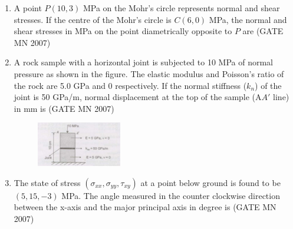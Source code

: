 \documentclass[journal]{IEEEtran}
\begin{document}
\begin{enumerate}
\item A point $P(10,3)$ MPa on the Mohr’s circle represents normal and shear stresses. If the centre of the Mohr’s circle is $C(6,0)$ MPa, the normal and shear stresses in MPa on the point diametrically opposite to $P$ are
	\hfill (GATE MN 2007)
\begin{enumerate}
	\begin{multicols}{4}
    \item 2, $-3$
    \item 4, $-3$
    \item 2, 3
    \item 4, 3
	    \end{multicols}
\end{enumerate}


\item A rock sample with a horizontal joint is subjected to 10 MPa of normal pressure as shown in the figure. The elastic modulus and Poisson’s ratio of the rock are 5.0 GPa and 0 respectively. If the normal stiffness ($k_n$) of the joint is 50 GPa/m, normal displacement at the top of the sample (A$A'$ line) in mm is
	\hfill (GATE MN 2007)
\begin{figure}[H]
    \centering
\includegraphics[width=0.35\textwidth]{Screenshot_2025_0812_124013.png}
\caption{}
    \label{fig:Q27}
\end{figure}
\begin{enumerate}
	\begin{multicols}{4}
    \item 0.2
    \item 0.4
    \item 0.6
    \item 0.8
	    \end{multicols}
\end{enumerate}



\item The state of stress $(\sigma_{xx}, \sigma_{yy}, \tau_{xy})$ at a point below ground is found to be $(5, 15, -3)$ MPa. The angle measured in the counter clockwise direction between the x-axis and the major principal axis in degree is
	\hfill (GATE MN 2007)
\begin{enumerate}
\end{enumerate}



\end{enumerate}
\end{document}
